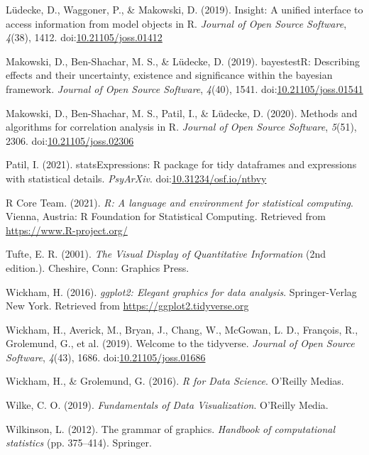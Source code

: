 \documentclass[10pt,a4paper,onecolumn]{article}
\newlength{\cslhangindent}
\newenvironment{CSLReferences}[3] %
 {%
  \setlength{\parindent}{0pt}
  \ifodd #1 \everypar{\setlength{\hangindent}{\cslhangindent}}\ignorespaces\fi
  \ifnum #2 > 0
  \setlength{\parskip}{#2\baselineskip}
  \fi
 }%
 {}
\begin{document}
\begin{CSLReferences}{1}{0}
\leavevmode{}%
Lüdecke, D., Waggoner, P., \& Makowski, D. (2019). Insight: A unified
interface to access information from model objects in {R}. \emph{Journal
of Open Source Software}, \emph{4}(38), 1412.
doi:\href{https://doi.org/10.21105/joss.01412}{10.21105/joss.01412}

\leavevmode{}%
Makowski, D., Ben-Shachar, M. S., \& Lüdecke, D. (2019). bayestestR:
Describing effects and their uncertainty, existence and significance
within the bayesian framework. \emph{Journal of Open Source Software},
\emph{4}(40), 1541.
doi:\href{https://doi.org/10.21105/joss.01541}{10.21105/joss.01541}

\leavevmode{}%
Makowski, D., Ben-Shachar, M. S., Patil, I., \& Lüdecke, D. (2020).
Methods and algorithms for correlation analysis in {R}. \emph{Journal of
Open Source Software}, \emph{5}(51), 2306.
doi:\href{https://doi.org/10.21105/joss.02306}{10.21105/joss.02306}

\leavevmode{}%
Patil, I. (2021). {statsExpressions}: R package for tidy dataframes and
expressions with statistical details. \emph{PsyArXiv}.
doi:\href{https://doi.org/10.31234/osf.io/ntbvy}{10.31234/osf.io/ntbvy}

\leavevmode{}%
R Core Team. (2021). \emph{{R}: A language and environment for
statistical computing}. Vienna, Austria: R Foundation for Statistical
Computing. Retrieved from \url{https://www.R-project.org/}

\leavevmode{}%
Tufte, E. R. (2001). \emph{The {Visual Display} of {Quantitative
Information}} (2nd edition.). {Cheshire, Conn}: {Graphics Press}.

\leavevmode{}%
Wickham, H. (2016). \emph{{ggplot2}: Elegant graphics for data
analysis}. Springer-Verlag New York. Retrieved from
\url{https://ggplot2.tidyverse.org}

\leavevmode{}%
Wickham, H., Averick, M., Bryan, J., Chang, W., McGowan, L. D.,
François, R., Grolemund, G., et al. (2019). Welcome to the {tidyverse}.
\emph{Journal of Open Source Software}, \emph{4}(43), 1686.
doi:\href{https://doi.org/10.21105/joss.01686}{10.21105/joss.01686}

\leavevmode{}%
Wickham, H., \& Grolemund, G. (2016). \emph{{R for Data Science}}.
O'Reilly Medias.

\leavevmode{}%
Wilke, C. O. (2019). \emph{{Fundamentals of Data Visualization}}.
O'Reilly Media.

\leavevmode{}%
Wilkinson, L. (2012). The grammar of graphics. \emph{Handbook of
computational statistics} (pp. 375--414). Springer.

\end{CSLReferences}
\end{document}
